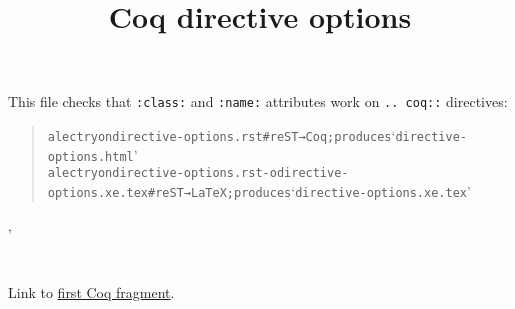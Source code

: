 \documentclass[a4paper]{article}
\begin{document}
\title{Coq directive options%
  \label{coq-directive-options}}
\author{}
\date{}
\maketitle

This file checks that \texttt{:class:} and \texttt{:name:} attributes work on \texttt{.. coq::} directives:

\begin{quote}
\begin{alltt}
alectryon directive-options.rst # reST → Coq; produces ‘directive-options.html’
alectryon directive-options.rst -o directive-options.xe.tex # reST → LaTeX; produces ‘directive-options.xe.tex’
\end{alltt}
\end{quote}

\begin{alectryon}
  \sep
  \begin{sentence}
    \begin{input}
      ~~~
    \end{input}
  \end{sentence}
\end{alectryon}

Link to \hyperref[test]{first Coq fragment}.
\end{document}
